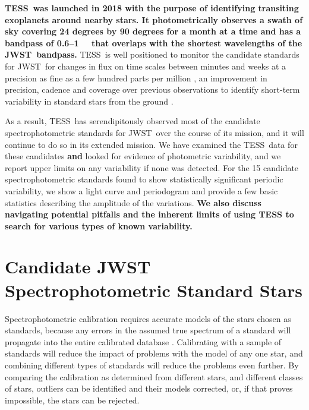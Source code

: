 \documentclass[twocolumn, linenumbers]{aastex631}
\newcommand{\webb}{JWST}
\newcommand{\tess}{TESS}
\newcommand{\mum}{\ifmmode{\rm \mu m}\else{$\mu$m}\fi}
\begin{document}
\textbf{\tess\ was launched in 2018 with the purpose of identifying transiting exoplanets around nearby stars.  It photometrically observes a swath of sky covering 24 degrees by 90 degrees for a month at a time and has a bandpass of 0.6--1~\mum\ \citep{Ricker2015} that overlaps with the shortest wavelengths of the \webb\ bandpass.} \tess\ is well positioned to monitor the candidate standards for \webb\ for changes in flux on time scales between minutes and weeks at a precision as fine as a few hundred parts per million \citep{Ricker2015}, an improvement in precision, cadence and coverage over previous observations to identify short-term variability in standard stars from the ground \citep[e.g.,][]{Marinoni2016}. 

As a result, \tess\ has serendipitously observed most of the candidate spectrophotometric standards for \webb\ over the course of its mission, and it will continue to do so in its extended mission.  We have examined the \tess\ data for these candidates \textbf{and} looked for evidence of photometric variability, and we report upper limits on any variability if none was detected.  For the 15 candidate spectrophotometric standards found to show statistically significant periodic variability, we show a light curve and periodogram and provide a few basic statistics describing the amplitude of the variations. \textbf{We also discuss navigating potential pitfalls and the inherent limits of using TESS to search for various types of known variability.}


\section{Candidate JWST Spectrophotometric Standard Stars} %
\label{sec:targets}

Spectrophotometric calibration requires accurate models of the stars chosen as standards, because any errors in the assumed true spectrum of a standard will propagate into the entire calibrated database \citep[e.g.][]{Cohen1992, Price2002, Sloan2015}.  Calibrating with a sample of standards will reduce the impact of problems with the model of any one star, and combining different types of standards will reduce the problems even further.  By comparing the calibration as determined from different stars, and different classes of stars, outliers can be identified and their models corrected, or, if that proves impossible, the stars can be rejected.

\end{document}
